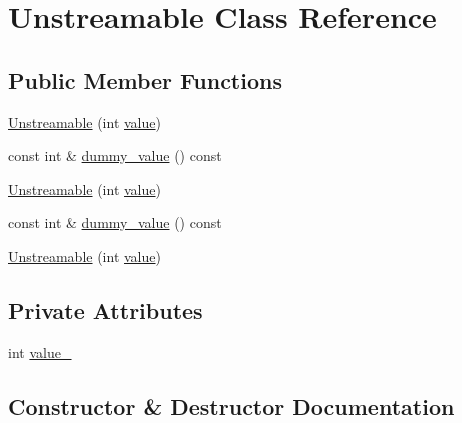 \hypertarget{class_unstreamable}{}\section{Unstreamable Class Reference}
\label{class_unstreamable}
\subsection*{Public Member Functions}
\begin{DoxyCompactItemize}
\item 
\mbox{\hyperlink{class_unstreamable_aec8af0d0f78468a9094f1b36332a0842}{Unstreamable}} (int \mbox{\hyperlink{_obj__test_2lib_2googletest-master_2googlemock_2test_2gmock-matchers__test_8cc_a337b8a670efc0b086ad3af163f3121b6}{value}})
\item 
const int \& \mbox{\hyperlink{class_unstreamable_a405ede3302a8fabd07a554c308ccf3ed}{dummy\+\_\+value}} () const
\item 
\mbox{\hyperlink{class_unstreamable_aec8af0d0f78468a9094f1b36332a0842}{Unstreamable}} (int \mbox{\hyperlink{_obj__test_2lib_2googletest-master_2googlemock_2test_2gmock-matchers__test_8cc_a337b8a670efc0b086ad3af163f3121b6}{value}})
\item 
const int \& \mbox{\hyperlink{class_unstreamable_a405ede3302a8fabd07a554c308ccf3ed}{dummy\+\_\+value}} () const
\item 
\mbox{\hyperlink{class_unstreamable_aec8af0d0f78468a9094f1b36332a0842}{Unstreamable}} (int \mbox{\hyperlink{_obj__test_2lib_2googletest-master_2googlemock_2test_2gmock-matchers__test_8cc_a337b8a670efc0b086ad3af163f3121b6}{value}})
\end{DoxyCompactItemize}
\subsection*{Private Attributes}
\begin{DoxyCompactItemize}
\item 
int \mbox{\hyperlink{class_unstreamable_a3b4a3b4fd9c1999f38b3c63b7de0fa07}{value\+\_\+}}
\end{DoxyCompactItemize}


\subsection{Constructor \& Destructor Documentation}
\mbox{\label{class_unstreamable_aec8af0d0f78468a9094f1b36332a0842}} 
